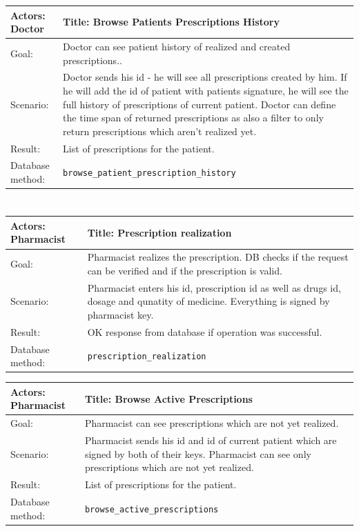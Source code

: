     \begin{longtable}{| p{6cm} | p{7.75cm} |}
    \hline
    Actors: Doctor &Title: Browse Patients Prescriptions History \\ \hline
    Goal: & Doctor can see patient history of realized and created prescriptions..\\ \hline
    Scenario: & Doctor sends his id - he will see all prescriptions created by him. If he will add the id of patient with patients signature, he will see the full history of prescriptions of current patient. Doctor can define the time span of returned prescriptions as also a filter to only return prescriptions which aren't realized yet. \\ \hline
    Result: & List of prescriptions for the patient. \\ \hline
    Database  method: & \texttt{browse\_patient\_prescription\_history} \\ \hline
    \end{longtable}
\normalsize

\section{}

\small
    \begin{longtable}{| p{6cm} | p{7.75cm} |}
    \hline
    Actors: Pharmacist &Title: Prescription realization\\ \hline
    Goal: & Pharmacist realizes the prescription. DB checks if the request can be verified and if the prescription is valid.\\ \hline
    Scenario: & Pharmacist enters his id, prescription id as well as drugs id, dosage and qunatity of medicine. Everything is signed by pharmacist key. \\ \hline
    Result: & OK response from database if operation was successful. \\ \hline
    Database  method: & \texttt{prescription\_realization} \\ \hline
    \end{longtable}



    \begin{longtable}{| p{6cm} | p{7.75cm} |}
    \hline
    Actors: Pharmacist &Title: Browse Active Prescriptions \\ \hline
    Goal: & Pharmacist can see prescriptions which are not yet realized. \\ \hline
    Scenario: & Pharmacist sends his id and id of current patient which are signed by both of their keys. Pharmacist can see only prescriptions which are not yet realized. \\ \hline
    Result: & List of prescriptions for the patient. \\ \hline
    Database  method: & \texttt{browse\_active\_prescriptions} \\ \hline
    \end{longtable}

